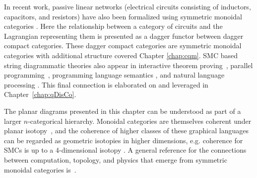 In recent work, passive linear networks (electrical circuits consisting of inductors, capacitors, and resistors) have also been formalized using symmetric monoidal categories \cite{baez2015compositional}. Here the relationship between a category of circuits and the Lagrangian representing them is presented as a dagger functor between dagger compact categories. These dagger compact categories are symmetric monoidal categories with additional structure covered Chapter \ref{chap:cqm}. SMC based string diagrammatic theories also appear in interactive theorem proving~\cite{grov2014tinker}, parallel programming~\cite{michaelson2012reasoning}, programming language semantics \cite{mellies2014local}, and natural language processing \cite{coecke2010mathematical}. This final connection is elaborated on and leveraged in Chapter~\ref{chap:qDisCo}.

The planar diagrams presented in this chapter can be understood as part of a larger $n$-categorical hierarchy. Monoidal categories are themselves coherent under planar isotopy~\cite{joyal1991geometry}, and the coherence of higher classes of these graphical languages can be regarded as geometric isotopies in higher dimensions, e.g. coherence for SMCs is up to a 4-dimensional isotopy \cite{selinger2011survey}. 
A general reference for the connections between computation, topology, and physics that emerge from symmetric monoidal categories is~\cite{baez2011physics}.

